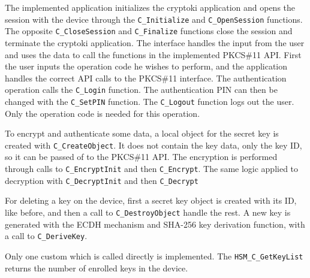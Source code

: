 The implemented application initializes the cryptoki application and opens the session with the device through the \texttt{C\_Initialize} and \texttt{C\_OpenSession} functions.
The opposite \texttt{C\_CloseSession} and \texttt{C\_Finalize} functions close the session and terminate the cryptoki application.
The interface handles the input from the user and uses the data to call the functions in the implemented PKCS\#11 API.
First the user inputs the operation code he wishes to perform, and the application handles the correct API calls to the PKCS\#11 interface.
The authentication operation calls the \texttt{C\_Login} function. The authentication PIN can then be changed with the \texttt{C\_SetPIN} function.
The \texttt{C\_Logout} function logs out the user. Only the operation code is needed for this operation.

To encrypt and authenticate some data, a local object for the secret key is created with \texttt{C\_CreateObject}. It does not contain the key data, only the key ID, so it can be passed of to the PKCS\#11 API. The encryption is performed through calls to \texttt{C\_EncryptInit} and then \texttt{C\_Encrypt}.
The same logic applied to decryption with \texttt{C\_DecryptInit} and then \texttt{C\_Decrypt}

For deleting a key on the device, first a secret key object is created with its ID, like before, and then a call to \texttt{C\_DestroyObject} handle the rest.
A new key is generated with the ECDH mechanism and \ac{SHA}-256 key derivation function, with a call to \texttt{C\_DeriveKey}.

Only one custom which is called directly is implemented. The \texttt{HSM\_C\_GetKeyList} returns the number of enrolled keys in the device.
